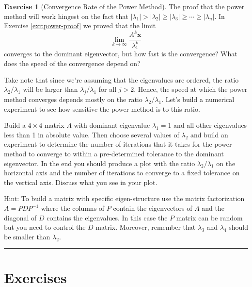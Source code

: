 \documentclass[
]{book}
\theoremstyle{definition}
\theoremstyle{definition}
\theoremstyle{definition}
\newtheorem{exercise}{Exercise}[chapter]
\theoremstyle{remark}
\begin{document}
\begin{exercise}[Convergence Rate of the Power Method]
\protect\hypertarget{exr:unnamed-chunk-372}{}{\label{exr:unnamed-chunk-372} {} }The proof that the power method will work hingest on the fact that \(|\lambda_1| > |\lambda_2| \geq |\lambda_3| \geq \cdots \geq |\lambda_n|\). In Exercise \ref{exr:power-proof} we proved that the limit
\[ \lim_{k \to \infty} \frac{A^k \boldsymbol{x}}{\lambda_1^k} \]
converges to the dominant eigenvector, but how fast is the convergence? What does the speed of the convergence depend on?

Take note that since we're assuming that the eigenvalues are ordered, the ratio \(\lambda_2 / \lambda_1\) will be larger than \(\lambda_j / \lambda_1\) for all \(j>2\). Hence, the speed at which the power method converges depends mostly on the ratio \(\lambda_2 / \lambda_1\). Let's build a numerical experiment to see how sensitive the power method is to this ratio.

Build a \(4 \times 4\) matrix \(A\) with dominant eigenvalue \(\lambda_1 = 1\) and all other eigenvalues less than 1 in absolute value. Then choose several values of \(\lambda_2\) and build an experiment to determine the number of iterations that it takes for the power method to converge to within a pre-determined tolerance to the dominant eigenvector. In the end you should produce a plot with the ratio \(\lambda_2 / \lambda_1\) on the horizontal axis and the number of iterations to converge to a fixed tolerance on the vertical axis. Discuss what you see in your plot.

Hint: To build a matrix with specific eigen-structure use the matrix factorization \(A = PDP^{-1}\) where the columns of \(P\) contain the eigenvectors of \(A\) and the diagonal of \(D\) contains the eigenvalues. In this case the \(P\) matrix can be random but you need to control the \(D\) matrix. Moreover, remember that \(\lambda_3\) and \(\lambda_4\) should be smaller than \(\lambda_2\).
\end{exercise}

\begin{center}\rule{0.5\linewidth}{0.5pt}\end{center}

\hypertarget{exercises-3}{%
\section{Exercises}\label{exercises-3}}
\end{document}
